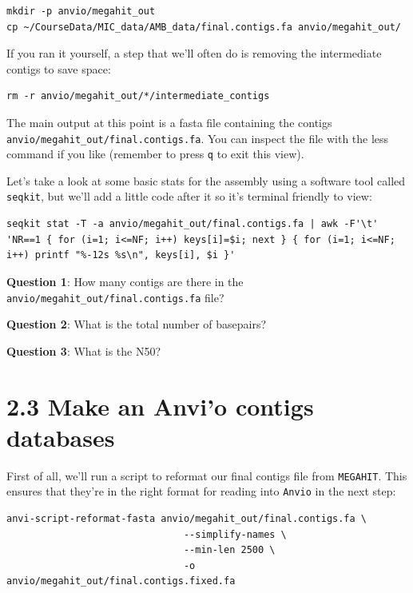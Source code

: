 \documentclass[
]{book}
\begin{document}
\begin{verbatim}
mkdir -p anvio/megahit_out
cp ~/CourseData/MIC_data/AMB_data/final.contigs.fa anvio/megahit_out/
\end{verbatim}

If you ran it yourself, a step that we'll often do is removing the intermediate contigs to save space:

\begin{verbatim}
rm -r anvio/megahit_out/*/intermediate_contigs
\end{verbatim}

The main output at this point is a fasta file containing the contigs \texttt{anvio/megahit\_out/final.contigs.fa}. You can inspect the file with the less command if you like (remember to press \texttt{q} to exit this view).

Let's take a look at some basic stats for the assembly using a software tool called \texttt{seqkit}, but we'll add a little code after it so it's terminal friendly to view:

\begin{verbatim}
seqkit stat -T -a anvio/megahit_out/final.contigs.fa | awk -F'\t' 'NR==1 { for (i=1; i<=NF; i++) keys[i]=$i; next } { for (i=1; i<=NF; i++) printf "%-12s %s\n", keys[i], $i }'
\end{verbatim}

\textbf{Question 1}: How many contigs are there in the \texttt{anvio/megahit\_out/final.contigs.fa} file?

\textbf{Question 2}: What is the total number of basepairs?

\textbf{Question 3}: What is the N50?

\section{2.3 Make an Anvi'o contigs databases}\label{make-an-anvio-contigs-databases}

First of all, we'll run a script to reformat our final contigs file from \texttt{MEGAHIT}. This ensures that they're in the right format for reading into \texttt{Anvi\textquotesingle{}o} in the next step:

\begin{verbatim}
anvi-script-reformat-fasta anvio/megahit_out/final.contigs.fa \
                               --simplify-names \
                               --min-len 2500 \
                               -o anvio/megahit_out/final.contigs.fixed.fa
\end{verbatim}
\end{document}
